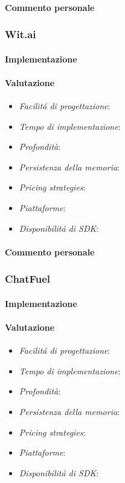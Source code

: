 \documentclass[]{article}
\begin{document}
\paragraph{Commento personale}

\subsubsection{Wit.ai}
\paragraph{Implementazione}
\paragraph{Valutazione}
\begin{itemize}
\item \textit{Facilitá di progettazione}: 
\item \textit{Tempo di implementazione}: 
\item \textit{Profondità}: 
\item \textit{Persistenza della memoria}: 
\item \textit{Pricing strategies}: 
\item \textit{Piattaforme}: 
\item \textit{Disponibilitá di SDK}: 
\end{itemize}
\paragraph{Commento personale}

\subsubsection{ChatFuel}
\paragraph{Implementazione}
\paragraph{Valutazione}
\begin{itemize}
\item \textit{Facilitá di progettazione}: 
\item \textit{Tempo di implementazione}: 
\item \textit{Profondità}: 
\item \textit{Persistenza della memoria}: 
\item \textit{Pricing strategies}: 
\item \textit{Piattaforme}: 
\item \textit{Disponibilitá di SDK}: 
\end{itemize}
\end{document}
